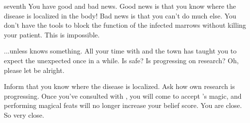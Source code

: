 \documentclass[greennotebook]{guildcamp4} %
\begin{document}
\begin{page}{seventh}
You have good and bad news. Good news is that you know where the disease is localized in the body! Bad news is that you can't do much else. You don't have the tools to block the function of the infected marrows without killing your patient. This is impossible. 

...unless \cRebel{} knows something. All your time with \cRebel{\them} and the town has taught you to expect the unexpected once in a while. Is \cRebel{} safe? Is \cRebel{\they} progressing on \cRebel{\their} research? Oh, please let \cRebel{\them} be alright.

Inform \cRebel{} that you know where the disease is localized. Ask \cRebel{\them} how \cRebel{\their} own research is progressing. Once you've consulted with \cRebel{\them}, you will come to accept \cRebel{}'s magic, and \cRebel{\them} performing magical feats will no longer increase your belief score. You are close. So very close.

\end{page}

\endnotebook
\end{document}
